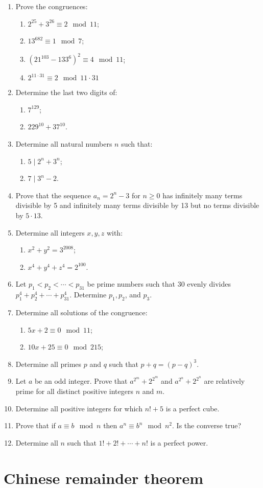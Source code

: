 \begin{enumerate}

  \item Prove the congruences:
   \begin{enumerate}
     \item $2^{25}+3^{26}\equiv 2\mod{11}$;
     \item $13^{682}\equiv1\mod{7}$;
     \item $(21^{103}-133^6)^2\equiv4\mod{11}$;
     \item $2^{11\cdot31}\equiv2\mod{11\cdot31}$
   \end{enumerate}
  \item Determine the last two digits of:
   \begin{enumerate}
     \item $7^{129}$;
     \item $229^{10}+37^{10}$.
   \end{enumerate}
  \item Determine all natural numbers $n$ such that:
   \begin{enumerate}
     \item $5\mid2^n+3^n$;
     \item $7\mid3^n-2$.
   \end{enumerate}
  \item Prove that the sequence $a_n = 2^n - 3$ for $n \ge 0$ has infinitely many terms divisible by 5 and infinitely many terms divisible by 13 but no terms divisible by $5\cdot13$.
  \item Determine all integers $x, y, z$ with:
   \begin{enumerate}
     \item $x^2+y^2 = 3^{2008}$;
     \item $x^4+y^4+z^4 = 2^{100}$.
   \end{enumerate}
  \item Let $p_1 < p_2 < \cdots < p_{31}$ be prime numbers such that $30$ evenly divides $p_1^4+p_2^4+\cdots+p_{31}^4$.  Determine $p_1, p_2$, and $p_3$.
  \item Determine all solutions of the congruence:
   \begin{enumerate}
    \item $5x+2\equiv0\mod{11}$;
    \item $10x+25\equiv0\mod{215}$;
   \end{enumerate}
  \item Determine all primes $p$ and $q$ such that $p+q = (p-q)^3$.
  \item Let $a$ be an odd integer.  Prove that $a^{2^m}+2^{2^m}$ and $a^{2^n}+2^{2^n}$ are relatively prime for all distinct positive integers $n$ and $m$.
  \item Determine all positive integers for which $n!+5$ is a perfect cube.
  \item Prove that if $a\equiv b\mod{n}$ then $a^n \equiv b^n\mod{n^2}$.  Is the converse true?
  \item Determine all $n$ such that $1!+2!+\cdots+n!$ is a perfect power.

\end{enumerate}
\section{Chinese remainder theorem}
\label{chinese-remainder}